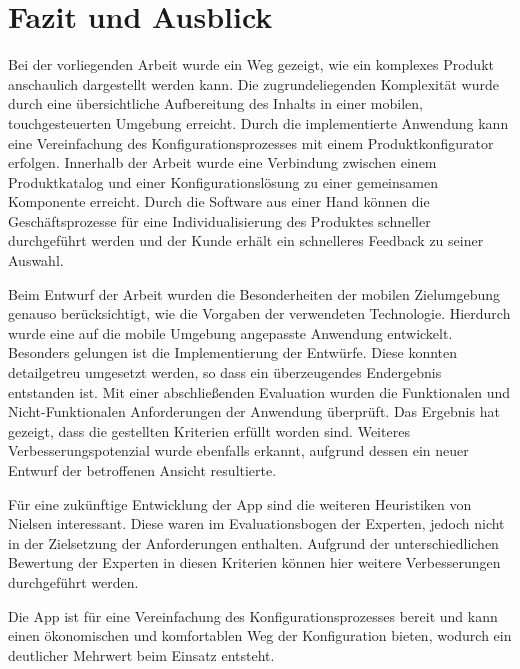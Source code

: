 \chapter{Fazit und Ausblick}\label{chapter_7}
Bei der vorliegenden Arbeit wurde ein Weg gezeigt, wie ein komplexes Produkt anschaulich dargestellt werden kann. Die zugrundeliegenden Komplexität wurde durch eine übersichtliche Aufbereitung des Inhalts in einer mobilen, touchgesteuerten Umgebung erreicht. Durch die implementierte Anwendung kann eine Vereinfachung des Konfigurationsprozesses mit einem Produktkonfigurator erfolgen. Innerhalb der Arbeit wurde eine Verbindung zwischen einem Produktkatalog und einer Konfigurationslösung zu einer gemeinsamen Komponente erreicht.  Durch die Software aus einer Hand können die Geschäftsprozesse für eine Individualisierung des Produktes schneller durchgeführt werden und der Kunde erhält ein schnelleres Feedback zu seiner Auswahl. \par 

Beim Entwurf der Arbeit wurden die Besonderheiten der mobilen Zielumgebung genauso berücksichtigt, wie die Vorgaben der verwendeten Technologie. Hierdurch wurde eine auf die mobile Umgebung angepasste Anwendung entwickelt. Besonders gelungen ist die Implementierung der Entwürfe. Diese konnten detailgetreu umgesetzt werden, so dass ein überzeugendes Endergebnis entstanden ist. Mit einer abschließenden Evaluation wurden die Funktionalen und Nicht-Funktionalen Anforderungen der Anwendung überprüft. Das Ergebnis hat gezeigt, dass die gestellten Kriterien erfüllt worden sind. Weiteres Verbesserungspotenzial wurde ebenfalls erkannt, aufgrund dessen ein neuer Entwurf der betroffenen Ansicht resultierte. 

Für eine zukünftige Entwicklung der App sind die weiteren Heuristiken von Nielsen interessant. Diese waren im Evaluationsbogen der Experten, jedoch nicht in der Zielsetzung der Anforderungen enthalten. Aufgrund der unterschiedlichen Bewertung der Experten in diesen Kriterien können hier weitere Verbesserungen durchgeführt werden. \par 

Die App ist für eine Vereinfachung des Konfigurationsprozesses bereit und kann einen ökonomischen und komfortablen Weg der Konfiguration bieten, wodurch ein deutlicher Mehrwert beim Einsatz entsteht.

